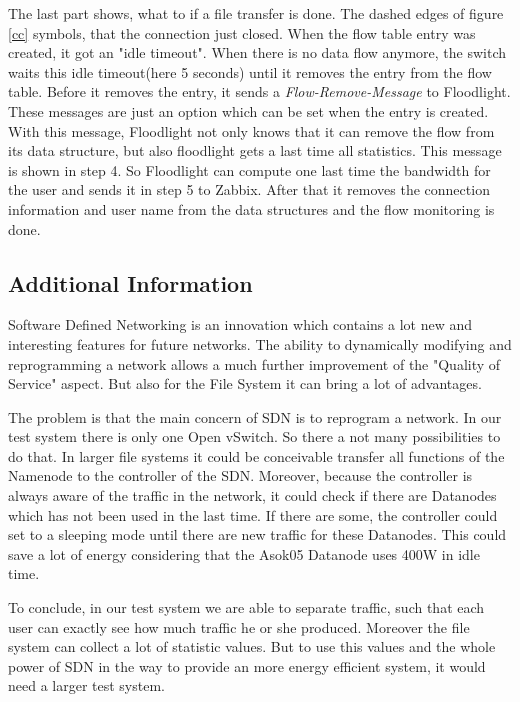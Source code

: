 The last part shows, what to if a file transfer is done. The dashed edges of figure \ref{cc} symbols, that the connection just closed. When the flow table entry was created, it got an "idle timeout"\cite[p. 11]{ofspec}. When there is no data flow anymore, the switch waits this idle timeout(here 5 seconds) until it removes the entry from the flow table. Before it removes the entry, it sends a \textit{Flow-Remove-Message}\cite[p. 37]{ofspec} to Floodlight. These messages are just an option which can be set when the entry is created. With this message, Floodlight not only knows that it can remove the flow from its data structure, but also floodlight gets a last time all statistics. This message is shown in step 4. So Floodlight can compute one last time the bandwidth for the user and sends it in step 5 to Zabbix. After that it removes the connection information and user name from the data structures and the flow monitoring is done.

\subsection{Additional Information}

Software Defined Networking is an innovation which contains a lot new and interesting features for future networks. The ability to dynamically modifying and reprogramming a network allows a much further improvement of the "Quality of Service" aspect. But also for the File System it can bring a lot of advantages.

The problem is that the main concern of SDN is to reprogram a network. In our test system there is only one Open vSwitch. So there a not many possibilities to do that. In larger file systems it could be conceivable transfer all functions of the Namenode to the controller of the SDN. Moreover, because the controller is always aware of the traffic in the network, it could check if there are Datanodes which has not been used in the last time. If there are some, the controller could set to a sleeping mode until there are new traffic for these Datanodes. This could save a lot of energy considering that the Asok05 Datanode uses 400W in idle time. 

To conclude, in our test system we are able to separate traffic, such that each user can exactly see how much traffic he or she produced. Moreover the file system can collect a lot of statistic values. But to use this values and the whole power of SDN in the way to provide an more energy efficient system, it would need a larger test system.  
